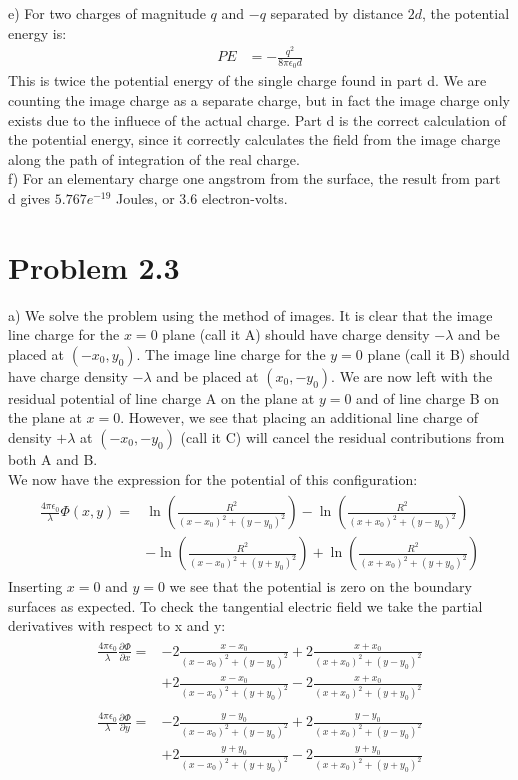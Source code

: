 \documentclass[a4paper,11pt]{article}
\numberwithin{equation}{section}
\newcommand{\ez}{\epsilon_0}
\newcommand{\lrp}[1]{\left({#1}\right)}
\begin{document}
e) For two charges of magnitude $q$ and $-q$ separated by distance $2d$, the potential energy is:
\begin{align}
 PE &= -\frac{q^2}{8\pi\ez d}
\end{align}
This is twice the potential energy of the single charge found in part d.
We are counting the image charge as a separate charge, but in fact the image charge only exists due to the influece of the actual charge.
Part d is the correct calculation of the potential energy, since it correctly calculates the field from the image charge along the path of integration of the real charge.
\\
f) For an elementary charge one angstrom from the surface, the result from part d gives $5.767e^{-19}$ Joules, or 3.6 electron-volts.


\section{Problem 2.3}
a) We solve the problem using the method of images.
It is clear that the image line charge for the $x=0$ plane (call it A) should have charge density $-\lambda$ and be placed at $(-x_0,y_0)$.
The image line charge for the $y=0$ plane (call it B) should have charge density $-\lambda$ and be placed at $(x_0,-y_0)$.
We are now left with the residual potential of line charge A on the plane at $y=0$ and of line charge B on the plane at $x=0$.
However, we see that placing an additional line charge of density $+\lambda$ at $(-x_0,-y_0)$ (call it C) will cancel the residual contributions from both A and B.
\\
We now have the expression for the potential of this configuration:
\begin{align}
 \begin{split}
 \frac{4\pi\ez}{\lambda}\Phi(x,y) = &\ln{\lrp{\frac{R^2}{(x-x_0)^2+(y-y_0)^2}}}
	      -\ln{\lrp{\frac{R^2}{(x+x_0)^2+(y-y_0)^2}}}\\
	      &-\ln{\lrp{\frac{R^2}{(x-x_0)^2+(y+y_0)^2}}}
	      +\ln{\lrp{\frac{R^2}{(x+x_0)^2+(y+y_0)^2}}}
 \end{split}
\end{align}
Inserting $x=0$ and $y=0$ we see that the potential is zero on the boundary surfaces as expected.
To check the tangential electric field we take the partial derivatives with respect to x and y:
\begin{align}
 \begin{split}
 \frac{4\pi\ez}{\lambda}\frac{\partial \Phi}{\partial x} = &-2\frac{x-x_0}{(x-x_0)^2+(y-y_0)^2}
      +2\frac{x+x_0}{(x+x_0)^2+(y-y_0)^2}\\
      &+2\frac{x-x_0}{(x-x_0)^2+(y+y_0)^2}
      -2\frac{x+x_0}{(x+x_0)^2+(y+y_0)^2}
 \end{split}\\
 \begin{split}
 \frac{4\pi\ez}{\lambda}\frac{\partial \Phi}{\partial y} = &-2\frac{y-y_0}{(x-x_0)^2+(y-y_0)^2}
      +2\frac{y-y_0}{(x+x_0)^2+(y-y_0)^2}\\
      &+2\frac{y+y_0}{(x-x_0)^2+(y+y_0)^2}
      -2\frac{y+y_0}{(x+x_0)^2+(y+y_0)^2}
 \end{split}
\end{align}
\end{document}
